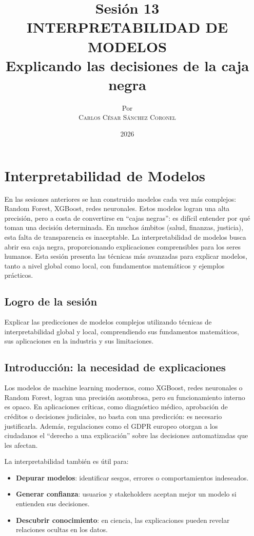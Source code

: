 \documentclass[12pt,a4paper,openany,oneside]{book}
\title{
    \textbf{Sesión 13} \\ 
    \Huge \textbf{INTERPRETABILIDAD DE MODELOS} \\
    \Large Explicando las decisiones de la caja negra
}
\author{
    \small Por \\ \vspace{0.2cm}
    \Large \textsc{Carlos César Sánchez Coronel}
}
\date{2026}
\begin{document}
\maketitle
\tableofcontents
{}

\chapter{Interpretabilidad de Modelos}

En las sesiones anteriores se han construido modelos cada vez más complejos: Random Forest, XGBoost, redes neuronales. Estos modelos logran una alta precisión, pero a costa de convertirse en ``cajas negras'': es difícil entender por qué toman una decisión determinada. En muchos ámbitos (salud, finanzas, justicia), esta falta de transparencia es inaceptable. La interpretabilidad de modelos busca abrir esa caja negra, proporcionando explicaciones comprensibles para los seres humanos. Esta sesión presenta las técnicas más avanzadas para explicar modelos, tanto a nivel global como local, con fundamentos matemáticos y ejemplos prácticos.

\section{Logro de la sesión}
Explicar las predicciones de modelos complejos utilizando técnicas de interpretabilidad global y local, comprendiendo sus fundamentos matemáticos, sus aplicaciones en la industria y sus limitaciones.

\section{Introducción: la necesidad de explicaciones}

Los modelos de machine learning modernos, como XGBoost, redes neuronales o Random Forest, logran una precisión asombrosa, pero su funcionamiento interno es opaco. En aplicaciones críticas, como diagnóstico médico, aprobación de créditos o decisiones judiciales, no basta con una predicción: es necesario justificarla. Además, regulaciones como el GDPR europeo otorgan a los ciudadanos el ``derecho a una explicación'' sobre las decisiones automatizadas que les afectan.

La interpretabilidad también es útil para:
\begin{itemize}
    \item \textbf{Depurar modelos}: identificar sesgos, errores o comportamientos indeseados.
    \item \textbf{Generar confianza}: usuarios y stakeholders aceptan mejor un modelo si entienden sus decisiones.
    \item \textbf{Descubrir conocimiento}: en ciencia, las explicaciones pueden revelar relaciones ocultas en los datos.
\end{itemize}
\end{document}
